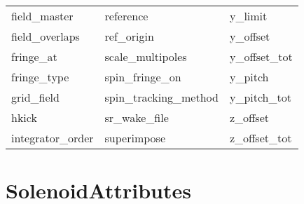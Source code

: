 \begin{tabular}{lll}
field_master                & reference                   & y_limit                     \\
field_overlaps              & ref_origin                  & y_offset                    \\
fringe_at                   & scale_multipoles            & y_offset_tot                \\
fringe_type                 & spin_fringe_on              & y_pitch                     \\
grid_field                  & spin_tracking_method        & y_pitch_tot                 \\
hkick                       & sr_wake_file                & z_offset                    \\
integrator_order            & superimpose                 & z_offset_tot                \\
 \bottomrule
 \end{tabular}
 \vfill
 
 \section{SolenoidAttributes}
 \label{s:list.solenoid}
 
